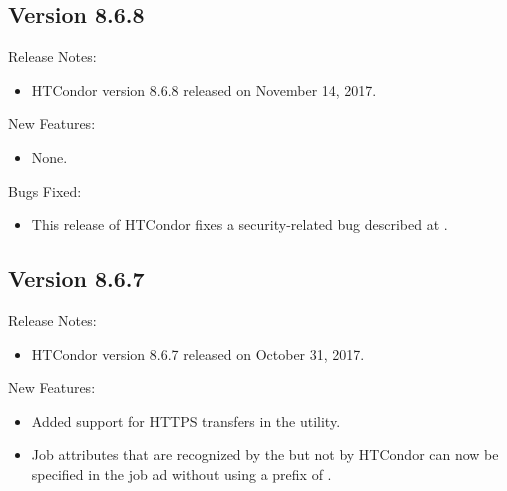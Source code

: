 \subsection*{\label{sec:New-8-6-8}Version 8.6.8}

\noindent Release Notes:

\begin{itemize}

\item HTCondor version 8.6.8 released on November 14, 2017.

\end{itemize}


\noindent New Features:

\begin{itemize}

\item None.

\end{itemize}

\noindent Bugs Fixed:

\begin{itemize}

\item \Security
This release of HTCondor fixes a security-related bug described at 
.

\end{itemize}

\subsection*{\label{sec:New-8-6-7}Version 8.6.7}

\noindent Release Notes:

\begin{itemize}

\item HTCondor version 8.6.7 released on October 31, 2017.

\end{itemize}


\noindent New Features:

\begin{itemize}

\item Added support for HTTPS transfers in the  utility.

\item Job attributes that are recognized by the 
but not by HTCondor can now be specified in the job ad without using
a prefix of .

\end{itemize}

